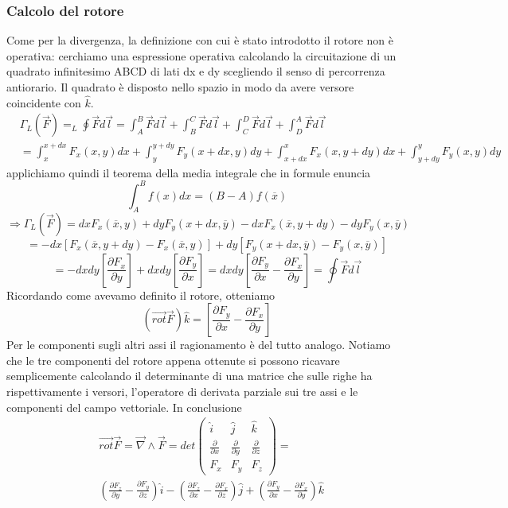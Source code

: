 \documentclass[10pt,a4paper]{article}
\begin{document}
\subsubsection{Calcolo del rotore}
Come per la divergenza, la definizione con cui è stato introdotto il rotore non è operativa: cerchiamo una espressione operativa calcolando la circuitazione di un quadrato infinitesimo ABCD di lati dx e dy scegliendo il senso di percorrenza antiorario. Il quadrato è disposto nello spazio in modo da avere versore coincidente con $\hat{k}$. 
\begin{align*}
	&\Gamma_L(\vec{F}) = _L\oint \vec{F} d\vec{l} = \int_{A}^{B} \vec{F} d\vec{l}+\int_{B}^{C} \vec{F} d\vec{l}+\int_{C}^{D} \vec{F} d\vec{l}+\int_{D}^{A} \vec{F} d\vec{l}\\
	&= \int_{x}^{x+dx} F_x(x,y) dx+\int_{y}^{y+dy} F_y(x+dx,y) dy+\int_{x+dx}^{x} F_x(x, y+dy) dx+\int_{y+dy}^{y} F_y(x, y) dy
\end{align*}  
applichiamo quindi il teorema della media integrale che in formule enuncia
\[\int_{A}^{B}f(x)dx=(B-A)f(\overline{x})\]
\[\Rightarrow\Gamma_L(\vec{F}) = dxF_x(\overline{x}, y)+dyF_y(x+dx, \overline{y})-dxF_x(\overline{x}, y+dy)-dyF_y(x, \overline{y})\]
\[=-dx[F_x(\overline{x}, y+dy)-F_x(\overline{x}, y)]+dy[F_y(x+dx, \overline{y})-F_y(x, \overline{y})]\]
\[=-dxdy\left[\frac{\partial F_x}{\partial y}\right]+dxdy\left[\frac{\partial F_y}{\partial x}\right] = dxdy\left[\frac{\partial F_y}{\partial x}-\frac{\partial F_x}{\partial y}\right]=\oint\vec{F}d\vec{l}\]
Ricordando come avevamo definito il rotore, otteniamo 
\[(\vec{rot}\vec{F})\hat{k} = \left[\frac{\partial F_y}{\partial x}-\frac{\partial F_x}{\partial y}\right]\]
Per le componenti sugli altri assi il ragionamento è del tutto analogo. Notiamo che le tre componenti del rotore appena ottenute si possono ricavare semplicemente calcolando il determinante di una matrice che sulle righe ha rispettivamente i versori, l'operatore di derivata parziale sui tre assi e le componenti del campo vettoriale. In conclusione
\begin{align*}
&\vec{rot}\vec{F}=\vec{\nabla}\wedge\vec{F}=det
\begin{pmatrix}
	\hat{i}&\hat{j}&\hat{k}\\
	\frac{\partial}{\partial x}&\frac{\partial}{\partial y}&\frac{\partial}{\partial z}\\
	F_x&F_y&F_z
\end{pmatrix}=\\
&(\frac{\partial F_z}{\partial y}-\frac{\partial F_y}{\partial z})\hat{i}
-(\frac{\partial F_z}{\partial x}-\frac{\partial F_x}{\partial z})\hat{j}
+(\frac{\partial F_y}{\partial x}-\frac{\partial F_x}{\partial y})\hat{k}
\end{align*}
\end{document}

